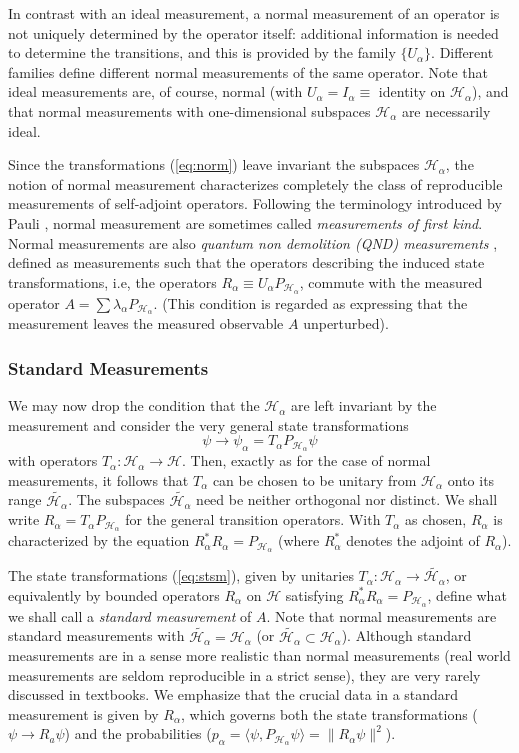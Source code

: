 \documentclass[12pt]{article}
\newcommand{\sa}{self-adjoint}
\renewcommand{\a}{\alpha}
\newcommand{\la}{\lambda_{\a}}
\newcommand{\psia}{\psi_{\a}}
\newcommand{\Ha}{{\H}_{\a}}
\renewcommand{\H}{\mbox{$\mathcal{H}$}}
\newcommand{\Pa}{ P_{ {\mathcal{H}_{\a} } } }
\newcommand{\Aa}{R_{\a}}
\newcommand{\norm}{\|}
\begin{document}
In contrast with an ideal measurement, a normal measurement of an
operator is not uniquely determined by the operator itself: additional
information is needed to determine the transitions, and this is
provided by the family $\{U_{\a}\}$.  Different families define
different normal measurements of the same operator.  Note that ideal
measurements are, of course, normal (with $U_{\a}= I_{\a} \equiv$
identity on $\Ha$), and that normal measurements with one-dimensional
subspaces $\Ha$ are necessarily ideal.

Since the transformations (\ref{eq:norm}) leave invariant the
subspaces $\Ha$, the notion of normal measurement characterizes
completely the class of reproducible measurements of \sa{} operators.
Following the terminology introduced by Pauli \cite{Pau58}, normal
measurement are sometimes called {\it measurements of first kind\/}.
Normal measurements are also \emph{quantum non demolition (QND)
   measurements\/} \cite{Brag}, defined as measurements such that the
operators describing the induced state transformations, i.e, the
operators $\Aa\equiv U_{\a}\Pa$, commute with the measured operator
$A=\sum\la\Pa$. (This condition is regarded as expressing that the
measurement leaves the measured observable $A$ unperturbed).

\subsubsection{Standard Measurements}
\label{sec:SM}
We may now drop the condition that the $\Ha$ are left invariant by the
measurement and consider the very general state transformations
\begin{equation}
\psi \to \psia=T_\a \Pa \psi
\label{eq:stsm}
\end{equation}
with operators $T_\a : \Ha\to\H$. Then, exactly as for the case of
normal measurements, it follows that $T_\a$ can be chosen to be
unitary {}from $\Ha$ onto its range $\widetilde{\Ha}$.  The subspaces
$\widetilde{\Ha}$ need be neither orthogonal nor distinct. We shall
write $R_\a=T_\a \Pa$ for the general transition operators. With
$T_\a$ as chosen, $R_\a$ is characterized by the equation
$\Aa^{\ast}\Aa = \Pa$ (where $\Aa^{\ast}$ denotes the adjoint of
$\Aa$).


The state transformations (\ref{eq:stsm}), given by unitaries $T_\a:
\Ha\to\widetilde{\Ha}$, or equivalently by bounded operators $R_\a$ on
$\H$ satisfying $\Aa^{\ast}\Aa = \Pa$, define what we shall call a
\emph{standard measurement} of $A$.  Note that normal measurements are
standard measurements with $\widetilde{\Ha}=\Ha$ (or $
\widetilde{\Ha}\subset \Ha$).  Although standard measurements are in a
sense more realistic than normal measurements (real world measurements
are seldom reproducible in a strict sense), they are very rarely
discussed in textbooks. We emphasize that the crucial data in a
standard measurement is given by $R_\a$, which governs both the state
transformations ($\psi\to R_a\psi$) and the probabilities ($p_\a =
\langle\psi, \Pa\psi\rangle= \norm R_\a\psi\norm^2$).
\end{document}
